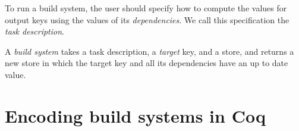 \documentclass[sigplan]{acmart}\settopmatter{printfolios=true,printccs=false,printacmref=false}
\begin{document}
To run a build system, the user should specify how to compute the values for
output keys using the values of its \emph{dependencies}. We call this
specification the \emph{task description}.

A \emph{build system} takes a task description, a \emph{target} key, and a
store, and returns a new store in which the target key and all its dependencies
have an up to date value.


\vspace{-3mm}
\section{Encoding build systems in Coq}\label{sec-abstractions}
\end{document}
